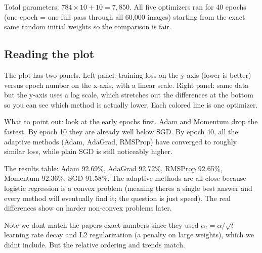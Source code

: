 \documentclass[11pt, letterpaper]{article}
\begin{document}
Total parameters: $784 \times 10 + 10 = 7{,}850$. All five optimizers ran for 40 epochs (one epoch = one full pass through all 60,000 images) starting from the exact same random initial weights so the comparison is fair.

\subsection{Reading the plot}
The plot has two panels. Left panel: training loss on the y-axis (lower is better) versus epoch number on the x-axis, with a linear scale. Right panel: same data but the y-axis uses a log scale, which stretches out the differences at the bottom so you can see which method is actually lower. Each colored line is one optimizer.

What to point out: look at the early epochs first. Adam and Momentum drop the fastest. By epoch 10 they are already well below SGD. By epoch 40, all the adaptive methods (Adam, AdaGrad, RMSProp) have converged to roughly similar loss, while plain SGD is still noticeably higher.

The results table: Adam 92.69\%, AdaGrad 92.72\%, RMSProp 92.65\%, Momentum 92.36\%, SGD 91.58\%. The adaptive methods are all close because logistic regression is a convex problem (meaning theres a single best answer and every method will eventually find it; the question is just speed). The real differences show on harder non-convex problems later.

Note we dont match the papers exact numbers since they used $\alpha_t = \alpha / \sqrt{t}$ learning rate decay and L2 regularization (a penalty on large weights), which we didnt include. But the relative ordering and trends match.
\end{document}

